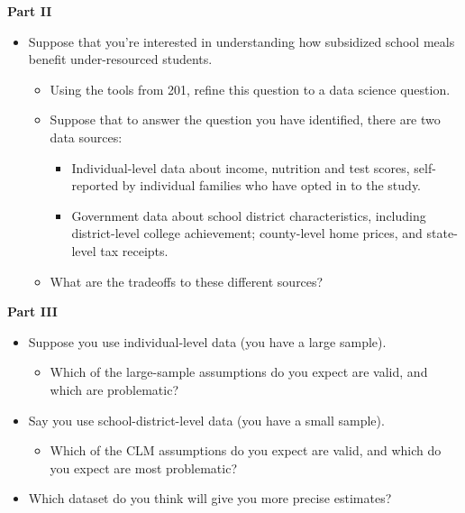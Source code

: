 \documentclass[
]{book}
\providecommand{\tightlist}{%
  \setlength{\itemsep}{0pt}\setlength{\parskip}{0pt}}
\theoremstyle{definition}
\theoremstyle{definition}
\theoremstyle{definition}
\theoremstyle{definition}
\theoremstyle{remark}
\begin{document}
\textbf{Part II}

\begin{itemize}
\tightlist
\item
  Suppose that you're interested in understanding how subsidized school meals benefit under-resourced students.

  \begin{itemize}
  \tightlist
  \item
    Using the tools from 201, refine this question to a data science question.
  \item
    Suppose that to answer the question you have identified, there are two data sources:

    \begin{itemize}
    \tightlist
    \item
      Individual-level data about income, nutrition and test scores, self-reported by individual families who have opted in to the study.\\
    \item
      Government data about school district characteristics, including district-level college achievement; county-level home prices, and state-level tax receipts.
    \end{itemize}
  \item
    What are the tradeoffs to these different sources?
  \end{itemize}
\end{itemize}

\textbf{Part III}

\begin{itemize}
\tightlist
\item
  Suppose you use individual-level data (you have a large sample).

  \begin{itemize}
  \tightlist
  \item
    Which of the large-sample assumptions do you expect are valid, and which are problematic?
  \end{itemize}
\item
  Say you use school-district-level data (you have a small sample).

  \begin{itemize}
  \tightlist
  \item
    Which of the CLM assumptions do you expect are valid, and which do you expect are most problematic?
  \end{itemize}
\item
  Which dataset do you think will give you more precise estimates?
\end{itemize}
\end{document}
